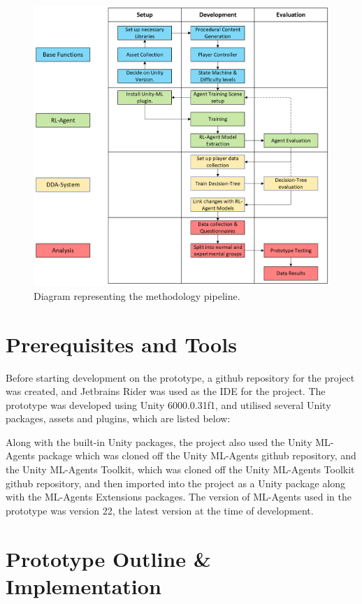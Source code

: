 \begin{spacing}{2.0}
	\begin{figure}[ht]
		\centering
		\includegraphics[width=5in, fbox]{Figures/ResearchPipeline.png}
		\caption{Diagram representing the methodology pipeline.}
		\label{fig:pipeline}
	\end{figure}

	\section{Prerequisites and Tools}

	Before starting development on the prototype, a github repository for the project was created, and Jetbrains Rider was used as the IDE for the project.
	The prototype was developed using Unity 6000.0.31f1, and utilised several Unity packages, assets and plugins, which are listed below:


	Along with the built-in Unity packages, the project also used the Unity ML-Agents package which was cloned off the Unity ML-Agents github repository, and the Unity ML-Agents Toolkit, which was cloned off the Unity ML-Agents Toolkit github repository,
	and then imported into the project as a Unity package along with the ML-Agents Extensions packages. The version of ML-Agents used in the prototype
	was version 22, the latest version at the time of development.

	\section{Prototype Outline \& Implementation}


\end{spacing}

